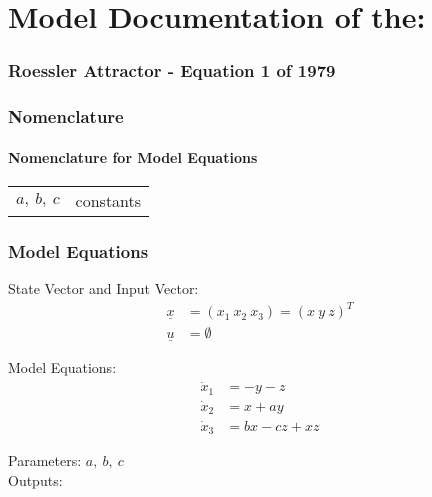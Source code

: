 \documentclass[10pt,a4paper]{article}
\begin{document}
	\part*{Model Documentation of the:}
	\section*{Roessler Attractor - Equation 1 of 1979} %
	
	
	\section{Nomenclature} %
	\subsection{Nomenclature for Model Equations} %
	
	\begin{tabular}{ll}
		$a,~b,~c$ & constants		
	\end{tabular}
	
	
	\section{Model Equations} %
	
	State Vector and Input Vector:
	\begin{align*}
		\underline{x} &= (x_1 \ x_2 \ x_3) = (x \ y \ z)^T \\
		\underline{u} &= \emptyset
	\end{align*}
	
	\noindent Model Equations:
	\begin{subequations}
	\begin{align}
		\dot{x}_1 &= - y - z	\\
		\dot{x}_2 &= x + ay \\
		\dot{x}_3 &= bx - cz + xz    
	\end{align}
	\end{subequations}

	\noindent
	Parameters: $a, \ b, \ c$ %
	\\
	Outputs: 
	
\end{document}
